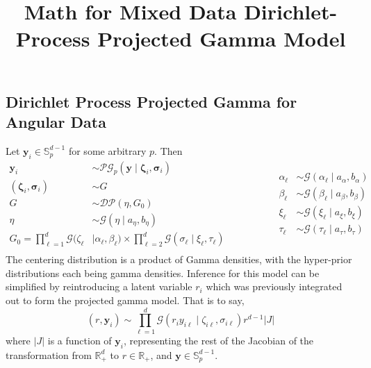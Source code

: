 \documentclass[10pt]{article}
\title{Math for Mixed Data Dirichlet-Process Projected Gamma Model}
\begin{document}
\maketitle

\subsection*{Dirichlet Process Projected Gamma for Angular Data}
Let $\bm{y}_i\in {\mathbb S}_{p}^{d-1}$ for some arbitrary $p$.  Then
\begin{equation*}
    \begin{aligned}
    \bm{y}_i &\sim \mathcal{PG}_p\left(\bm{y}\mid\bm{\zeta}_i,\bm{\sigma}_i\right)\\
    (\bm{\zeta}_i,\bm{\sigma}_i) &\sim G \\
    G &\sim \mathcal{DP}\left(\eta, G_0\right)\\
    \eta &\sim \mathcal{G}\left(\eta\mid a_{\eta}, b_{\eta}\right)\\
    G_0 = \prod_{\ell = 1}^d\mathcal{G}(\zeta_{\ell}&\mid\alpha_{\ell},\beta_{\ell})\times\prod_{\ell = 2}^d\mathcal{G}(\sigma_{\ell}\mid\xi_{\ell},\tau_{\ell})\\
    \end{aligned}
    \hspace{2cm}
    \begin{aligned}
    \alpha_{\ell} &\sim \mathcal{G}(\alpha_{\ell} \mid a_{\alpha},b_{\alpha})\\
    \beta_{\ell} &\sim \mathcal{G}(\beta_{\ell}\mid a_{\beta}, b_{\beta})\\
    \xi_{\ell} &\sim \mathcal{G}(\xi_{\ell} \mid a_{\xi}, b_{\xi})\\
    \tau_{\ell} &\sim \mathcal{G}(\tau_{\ell}\mid a_{\tau},b_{\tau})\\
    \end{aligned}
\end{equation*}
The centering distribution is a product of Gamma densities, with the hyper-prior distributions 
    each being gamma densities. Inference for this model can be simplified by reintroducing a 
    latent variable $r_i$ which was previously integrated out to form the projected gamma model.  
    That is to say,
\[
    (r,\bm{y}_i) \sim \prod_{\ell = 1}^d \mathcal{G}\left(r_iy_{i\ell}\mid\zeta_{i\ell},\sigma_{i\ell}\right)r^{d-1}\lvert J \rvert
\]
where $\lvert J \rvert$ is a function of $\bm{y}_i$, representing the rest of the Jacobian of
    the transformation from ${\mathbb R}_+^d$ to $r\in {\mathbb R}_+$, and $\bm{y}\in{\mathbb S}_p^{d-1}$.
\end{document}
